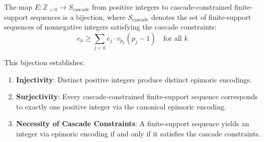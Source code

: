 \begin{proposition}
\label{prop:encoding-injectivity}
The map $E: \mathbb{Z}_{>0} \to S_{\text{cascade}}$ from positive integers to cascade-constrained finite-support sequences is a bijection, where $S_{\text{cascade}}$ denotes the set of finite-support sequences of nonnegative integers satisfying the cascade constraints:
\begin{equation}
e_k \geq \sum_{j < k} e_j \cdot v_{p_k}(p_j - 1) \quad \text{for all } k
\end{equation}

This bijection establishes:
\begin{enumerate}
\item \textbf{Injectivity}: Distinct positive integers produce distinct epimoric encodings.
\item \textbf{Surjectivity}: Every cascade-constrained finite-support sequence corresponds to exactly one positive integer via the canonical epimoric encoding.
\item \textbf{Necessity of Cascade Constraints}: A finite-support sequence yields an integer via epimoric encoding if and only if it satisfies the cascade constraints.
\end{enumerate}
\end{proposition}

